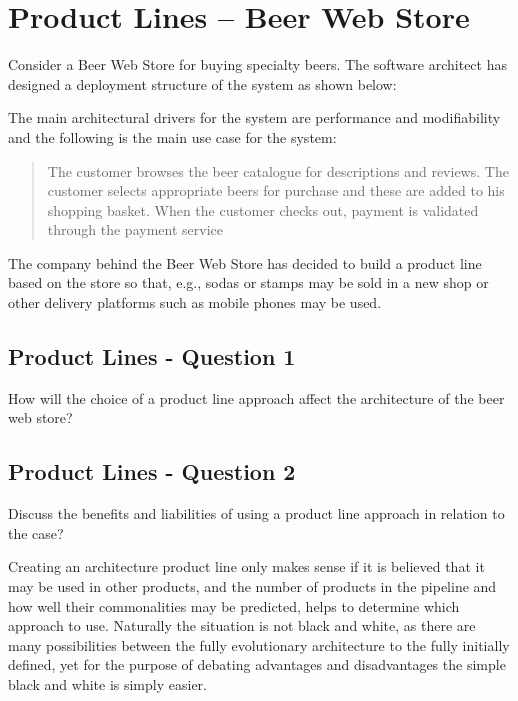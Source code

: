 \section{Product Lines -- Beer Web Store}
Consider a Beer Web Store for buying specialty beers. The software
architect has designed a deployment structure of the system as shown
below:
\begin{figure}[h!]
  \centerline{}
  \label{fig:observation}
\end{figure}
The main architectural drivers for the system are performance and
modifiability and the following is the main use case for the system:
\begin{quote}
  The customer browses the beer catalogue for descriptions and
  reviews. The customer selects appropriate beers for purchase and
  these are added to his shopping basket. When the customer checks
  out, payment is validated through the payment service
\end{quote}

The company behind the Beer Web Store has decided to build a product
line based on the store so that, e.g., sodas or stamps may be sold in
a new shop or other delivery platforms such as mobile phones may be
used.

\subsection{Product Lines - Question 1}

\begin{question}
How will the choice of a product line approach affect the
architecture of the beer web store?
\end{question}


\subsection{Product Lines - Question 2}

\begin{question}
Discuss the benefits and liabilities of using a product line
approach in relation to the case?
\end{question}

Creating an architecture product line only makes sense if it is believed that it may be used in other products, and the number of products in the pipeline and how well their commonalities may be predicted, helps to determine which approach to use. Naturally the situation is not black and white, as there are many possibilities between the fully evolutionary architecture to the fully initially defined, yet for the purpose of debating advantages and disadvantages the simple black and white is simply easier.

